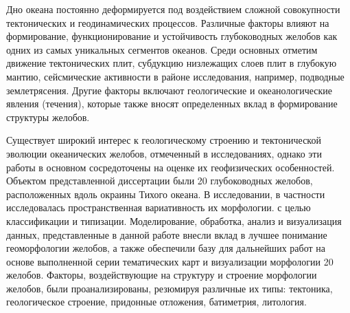 Дно океана постоянно деформируется под воздействием сложной совокупности тектонических и геодинамических процессов. Различные факторы влияют на формирование, функционирование и устойчивость глубоководных желобов как одних из самых уникальных сегментов океанов. Среди основных отметим движение тектонических плит, субдукцию низлежащих слоев плит в глубокую мантию, сейсмические активности в районе исследования, например, подводные землетрясения. Другие факторы включают геологические и океанологические явления (течения), которые также вносят определенных вклад в формирование структуры желобов.

Существует широкий интерес к геологическому строению и тектонической эволюции океанических желобов, отмеченный в исследованиях, однако эти работы в основном сосредоточены на оценке их геофизических особенностей. Объектом представленной диссертации были 20 глубоководных желобов, расположенных вдоль окраины Тихого океана. В исследовании, в частности исследовалась пространственная вариативность их морфологии. с целью классификации и типизации. Моделирование, обработка, анализ и визуализация данных, представленные в данной работе внесли вклад в лучшее понимание геоморфологии желобов, а также обеспечили базу для дальнейших работ на основе выполненной серии тематических карт и визуализации морфологии 20 желобов. Факторы, воздействующие на структуру и строение морфологии желобов, были проанализированы, резюмируя различные их типы: тектоника, геологическое строение, придонные отложения, батиметрия, литология.




